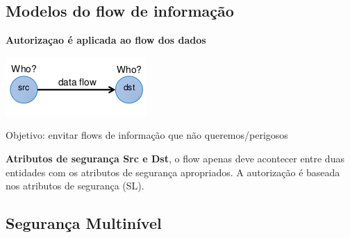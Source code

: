 \documentclass{article}
\begin{document}
\subsection{Modelos do flow de informação}

\begin{flushleft}
  \textbf{Autorizaçao é aplicada ao flow dos dados}
  \begin{center}
    \includegraphics[scale=0.4]{20}
  \end{center}
  Objetivo: envitar flows de informação que não queremos/perigosos

  \vspace{2mm}

  \textbf{Atributos de segurança Src e Dst}, o flow apenas deve acontecer entre duas entidades
  com os atributos de segurança apropriados. A autorização é baseada nos atributos de segurança (SL).
\end{flushleft}


\subsection{Segurança Multinível}
\end{document}
